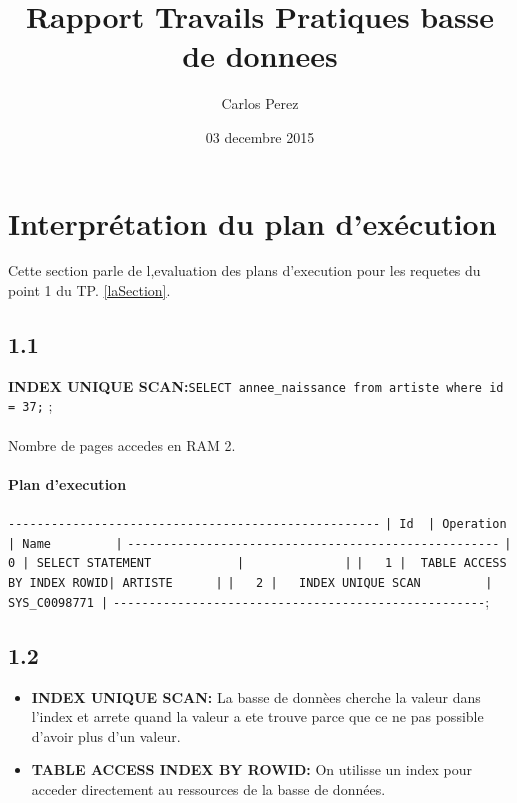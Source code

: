 \documentclass{article}
\title{Rapport Travails Pratiques basse de donnees}
\author{Carlos Perez}
\begin{document}
\maketitle 
\tableofcontents
\date{03 decembre 2015}




\section{Interprétation du plan d’exécution}
\label{laSectionUne}

Cette section parle de l,evaluation des plans d'execution pour les requetes
du point 1 du TP.  \ref{laSection}. 

\subsection{1.1}
\label{laSousSectionUne}

\textbf{INDEX UNIQUE SCAN:}\verb!SELECT annee_naissance from artiste where id = 37;! ;
\paragraph{} Nombre de pages accedes en RAM 2.
\paragraph{ Plan d'execution}
\verb!----------------------------------------------------!
\verb!| Id  | Operation                   | Name         |!
\verb!----------------------------------------------------!
\verb!|   0 | SELECT STATEMENT            |              |!
\verb!|   1 |  TABLE ACCESS BY INDEX ROWID| ARTISTE      |!
\verb!|   2 |   INDEX UNIQUE SCAN         | SYS_C0098771 |!
\verb!----------------------------------------------------!;

\subsection{1.2}
\begin{itemize} 
\item \textbf{INDEX UNIQUE SCAN:} La basse de donnèes cherche la valeur dans l'index
et arrete quand la valeur a ete trouve parce que ce ne pas possible d'avoir plus 
d'un valeur.
\item \textbf{TABLE ACCESS INDEX BY ROWID:} On utilisse un index pour acceder directement
au ressources de la basse de données.
\end{itemize} 
 
\end{document}
